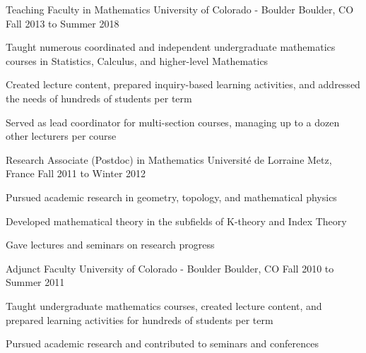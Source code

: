 \begin{cventries}
  \cventry
    {Teaching Faculty in Mathematics} %
    {University of Colorado - Boulder} %
    {Boulder, CO} %
    {Fall 2013 to Summer 2018} %
    {
      \begin{cvitems} %
        \item {Taught numerous coordinated and independent undergraduate mathematics courses in Statistics, Calculus, and higher-level Mathematics}
        \item {Created lecture content, prepared inquiry-based learning activities, and addressed the needs of hundreds of students per term}
        \item {Served as lead coordinator for multi-section courses, managing up to a dozen other lecturers per course}
      \end{cvitems}
    }

  \cventry
    {Research Associate (Postdoc) in Mathematics} %
    {Universit\'e de Lorraine} %
    {Metz, France} %
    {Fall 2011 to Winter 2012} %
    {
      \begin{cvitems} %
      \item {Pursued academic research in geometry, topology, and mathematical physics}
      \item {Developed mathematical theory in the subfields of K-theory and Index Theory}
      \item {Gave lectures and seminars on research progress}
      \end{cvitems}
    }

  \cventry
    {Adjunct Faculty} %
    {University of Colorado - Boulder} %
    {Boulder, CO} %
    {Fall 2010 to Summer 2011} %
    {
      \begin{cvitems} %
        \item {Taught undergraduate mathematics courses, created lecture content, and prepared learning activities for hundreds of students per term}
        \item {Pursued academic research and contributed to seminars and conferences}
      \end{cvitems}
    }

\end{cventries}
